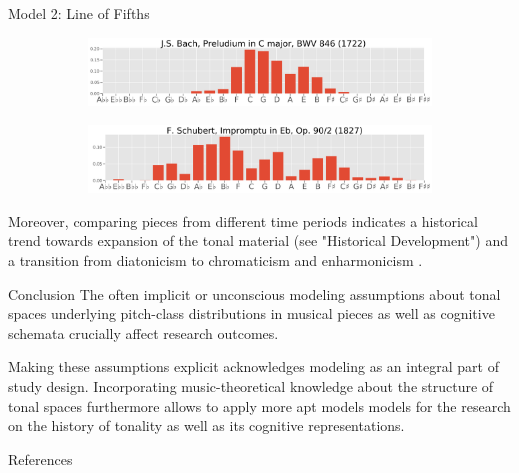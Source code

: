 \documentclass[final,cmyk]{beamer}
\begin{document}
\begin{frame}[t]
\begin{minipage}[t][.68\textheight][t]{\textwidth}
\begin{columns}[t]
\begin{column}{0.3\textwidth}
\begin{block}{Model 2: Line of Fifths}
\begin{figure}
				\begin{subfigure}{\textwidth} %
					\includegraphics[width=\textwidth]{img/gmm_bach.png}
				\end{subfigure}

				\begin{subfigure}{\textwidth} %
					\includegraphics[width=\textwidth]{img/gmm_schubert.png}
				\end{subfigure}
			\end{figure}

			Moreover, comparing pieces from different time periods indicates a historical trend towards expansion of the tonal material (see "Historical Development") and a transition from diatonicism to chromaticism and enharmonicism \autocite{Gardonyi2002}.
      \end{block}

			\begin{block}{Conclusion}
        The often implicit or unconscious modeling \alert{assumptions about tonal spaces}
        underlying pitch-class distributions in musical pieces as well as cognitive schemata
        crucially affect research outcomes.

				Making these assumptions explicit
        acknowledges \alert{modeling} as an integral part of study design.
				Incorporating music-theoretical knowledge about the structure of tonal
				spaces furthermore allows to apply more apt models models for
				the research on the \alert{history of tonality} as well as its
				\alert{cognitive representations}.
      \end{block}

			\begin{block}{References}
          \printbibliography
      \end{block}


    \end{column}


\end{columns}
\end{minipage}
\end{frame}
\end{document}
